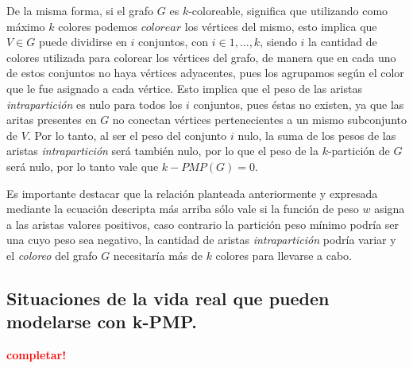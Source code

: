 De la misma forma, si el grafo $G$ es $k$-coloreable, significa que utilizando
como máximo $k$ colores podemos $colorear$ los vértices del mismo, esto implica
que $V \in G$ puede dividirse en $i$ conjuntos, con $i \in {1, \dots, k}$, siendo $i$
la cantidad de colores utilizada para colorear los vértices del grafo, de manera
que en cada uno de estos conjuntos no haya vértices adyacentes, pues los agrupamos
según el color que le fue asignado a cada vértice. Esto implica que el peso de
las aristas \textit{intrapartición} es nulo para todos los $i$ conjuntos, pues éstas no
existen, ya que las aritas presentes en $G$ no conectan vértices pertenecientes a
un mismo subconjunto de $V$. Por lo tanto, al ser el peso del conjunto $i$ nulo,
la suma de los pesos de las aristas \textit{intrapartición} será también nulo, por lo
que el peso de la $k$-partición de $G$ será nulo, por lo tanto vale que $k-PMP(G) = 0$.

Es importante destacar que la relación planteada anteriormente y expresada mediante
la ecuación descripta más arriba sólo vale si la función de peso $w$ asigna a las
aristas valores positivos, caso contrario la partición peso mínimo podría ser una
cuyo peso sea negativo, la cantidad de aristas \textit{intrapartición} podría variar y el
\textit{coloreo} del grafo $G$ necesitaría más de $k$ colores para llevarse a cabo.



\newpage
\subsection{Situaciones de la vida real que pueden modelarse con k-PMP.}
\vspace*{0.3cm}
\textcolor{red}{\textbf{completar!}}

